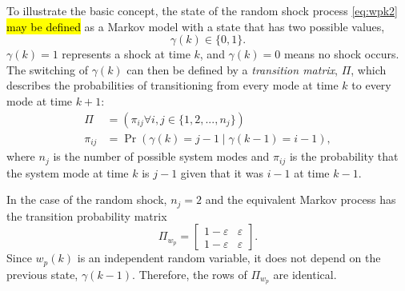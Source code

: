 To illustrate the basic concept, the state of the random shock process \eqref{eq:wpk2} \hl{may be defined} as a Markov model with a state that has two possible values,
\begin{equation} \label{eq:gamma-k}
	\gamma(k) \in \{0,1\}.
\end{equation}
%
$\gamma(k)=1$ represents a shock at time $k$, and $\gamma(k)=0$ means no shock occurs. The switching of $\gamma(k)$ can then be defined by a \textit{transition matrix}, $\Pi$, which describes the probabilities of transitioning from every mode at time $k$ to every mode at time $k+1$:
\begin{equation} \label{eq:Pi}
	\begin{aligned}
	\Pi &= \left(\pi_{ij} \forall i,j\in \{1,2,...,n_j\}\right) \\
	\pi_{ij} &= \Pr\left( \gamma(k)=j-1 \mid \gamma(k-1)=i-1 \right),
	\end{aligned}
\end{equation}
%
%
where $n_j$ is the number of possible system modes and $\pi_{ij}$ is the probability that the system mode at time $k$ is $j-1$ given that it was $i-1$ at time $k-1$.

In the case of the random shock, $n_j=2$ and the equivalent Markov process has the transition probability matrix
%
\begin{equation} \label{eq:Pi-RODD-step}
	\Pi_{w_{p}} = \begin{bmatrix}
	1-\varepsilon & \varepsilon \\
	1-\varepsilon & \varepsilon
	\end{bmatrix}.
\end{equation}
Since $w_{p}(k)$ is an independent random variable, it does not depend on the previous state, $\gamma(k-1)$. Therefore, the rows of $\Pi_{w_{p}}$ are identical.

